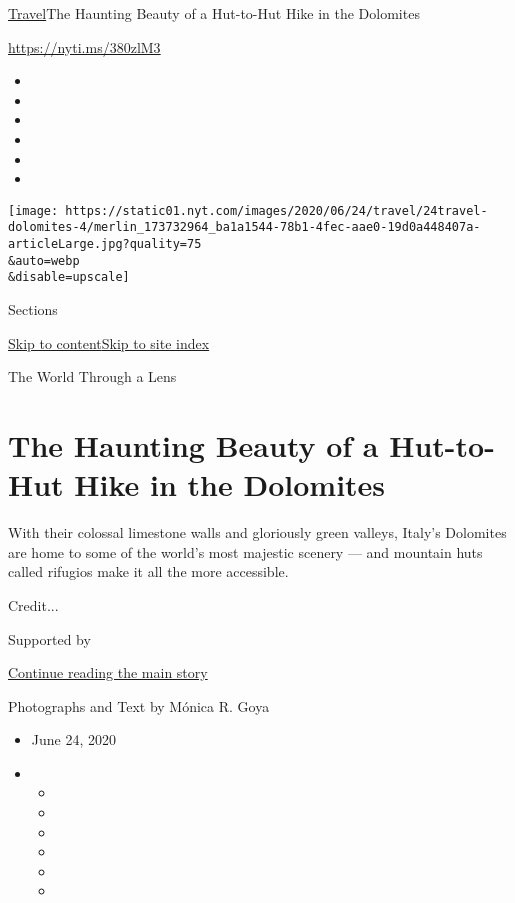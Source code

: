 \href{/section/travel}{Travel}\textbar{}The Haunting Beauty of a
Hut-to-Hut Hike in the Dolomites

\url{https://nyti.ms/380zlM3}

\begin{itemize}
\item
\item
\item
\item
\item
\item
\end{itemize}

\texttt{[image: https://static01.nyt.com/images/2020/06/24/travel/24travel-dolomites-4/merlin\_173732964\_ba1a1544-78b1-4fec-aae0-19d0a448407a-articleLarge.jpg?quality=75\\\&auto=webp\\\&disable=upscale]}

Sections

\protect\hyperlink{site-content}{Skip to
content}\protect\hyperlink{site-index}{Skip to site index}

The World Through a Lens

\hypertarget{the-haunting-beauty-of-a-hut-to-hut-hike-in-the-dolomites}{%
\section{The Haunting Beauty of a Hut-to-Hut Hike in the
Dolomites}\label{the-haunting-beauty-of-a-hut-to-hut-hike-in-the-dolomites}}

With their colossal limestone walls and gloriously green valleys,
Italy's Dolomites are home to some of the world's most majestic scenery
--- and mountain huts called rifugios make it all the more accessible.

Credit...

Supported by

\protect\hyperlink{after-sponsor}{Continue reading the main story}

Photographs and Text by Mónica R. Goya

\begin{itemize}
\item
  June 24, 2020
\item
  \begin{itemize}
  \item
  \item
  \item
  \item
  \item
  \item
  \end{itemize}
\end{itemize}

